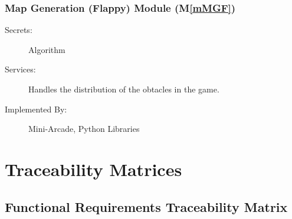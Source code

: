 \documentclass[12pt, titlepage]{article}
\newcommand{\mref}[1]{M\ref{#1}}
\begin{document}
\subsubsection{Map Generation (Flappy) Module (\mref{mMGF})}
\begin{description}
\item[Secrets:] Algorithm
\item[Services:] Handles the distribution of the obtacles in the game.
\item[Implemented By:] Mini-Arcade, Python Libraries
\end{description}

\newpage
\section{Traceability Matrices} \label{SecTM}
\subsection{Functional Requirements Traceability Matrix}
\end{document}
